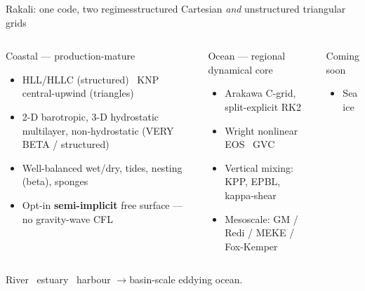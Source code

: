 \documentclass[aspectratio=169]{beamer}
\newcommand{\cplx}[1]{{\footnotesize\color{cookieMuted}#1}}
\begin{document}
\begin{frame}{Rakali: one code, two regimes}{structured Cartesian \emph{and} unstructured triangular grids}
  \begin{columns}[T,onlytextwidth]
      \begin{block}{Coastal --- production-mature}
        \begin{itemize}
          \item HLL/HLLC (structured) \textperiodcentered\ KNP central-upwind (triangles)
          \item 2-D barotropic, 3-D hydrostatic multilayer, non-hydrostatic \cplx{(VERY BETA / structured)}
          \item Well-balanced wet/dry, tides, nesting (beta), sponges
          \item Opt-in \textbf{semi-implicit} free surface --- no gravity-wave CFL
        \end{itemize}
      \end{block}
      \begin{block}{Ocean --- regional dynamical core}
        \begin{itemize}
          \item Arakawa C-grid, split-explicit RK2
          \item Wright nonlinear EOS \textperiodcentered\ GVC
          \item Vertical mixing: KPP, EPBL, kappa-shear
          \item Mesoscale: GM / Redi / MEKE / Fox-Kemper
        \end{itemize}
      \end{block}
      \begin{block}{Coming soon}
          \begin{itemize}
              \item Sea ice
          \end{itemize}
      \end{block}
  \end{columns}
  \vspace{.3em}
  \centering\footnotesize River \textperiodcentered\ estuary \textperiodcentered\ harbour \quad$\longrightarrow$\quad basin-scale eddying ocean.
\end{frame}
\end{document}
